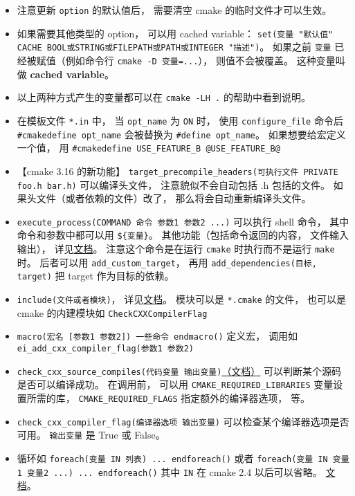 \begin{itemize}
\item 注意更新 \verb`option` 的默认值后， 需要清空 cmake 的临时文件才可以生效。
\item 如果需要其他类型的 option， 可以用 cached variable： \verb`set(变量 "默认值" CACHE BOOL或STRING或FILEPATH或PATH或INTEGER "描述")`。 如果之前 \verb`变量` 已经被赋值（例如命令行 \verb`cmake -D 变量=...`）， 则值不会被覆盖。 这种变量叫做 \textbf{cached variable}。
\item 以上两种方式产生的变量都可以在 \verb`cmake -LH .` 的帮助中看到说明。
\item 在模板文件 \verb`*.in` 中， 当 \verb`opt_name` 为 \verb`ON` 时， 使用 \verb`configure_file` 命令后 \verb`#cmakedefine opt_name` 会被替换为 \verb`#define opt_name`。 如果想要给宏定义一个值， 用 \verb`#cmakedefine USE_FEATURE_B @USE_FEATURE_B@`
\item 【cmake 3.16 的新功能】 \verb`target_precompile_headers(可执行文件 PRIVATE foo.h bar.h)` 可以编译头文件， 注意貌似不会自动包括 .h 包括的文件。 如果头文件（或者依赖的文件）改了， 那么将会自动重新编译头文件。
\item \verb`execute_process(COMMAND 命令 参数1 参数2 ...)` 可以执行 shell 命令， 其中命令和参数中都可以用 \verb`${变量}`。 其他功能（包括命令返回的内容， 文件输入输出）， 详见\href{https://cmake.org/cmake/help/latest/command/execute_process.html}{文档}。 注意这个命令是在运行 \verb`cmake` 时执行而不是运行 \verb`make` 时。 后者可以用 \verb`add_custom_target`， 再用 \verb`add_dependencies(目标, target)` 把 target 作为目标的依赖。
\item \verb`include(文件或者模块)`， 详见\href{https://cmake.org/cmake/help/latest/command/include.html}{文档}。 模块可以是 \verb`*.cmake` 的文件， 也可以是 cmake 的内建模块如 \verb`CheckCXXCompilerFlag`
\item \verb`macro(宏名 [参数1 参数2]) 一些命令 endmacro()` 定义宏， 调用如 \verb`ei_add_cxx_compiler_flag(参数1 参数2)`
\item \verb`check_cxx_source_compiles(代码变量 输出变量)`\href{https://cmake.org/cmake/help/latest/module/CheckCXXSourceCompiles.html}{（文档）} 可以判断某个源码是否可以编译成功。 在调用前， 可以用 \verb`CMAKE_REQUIRED_LIBRARIES` 变量设置所需的库， \verb`CMAKE_REQUIRED_FLAGS` 指定额外的编译器选项， 等。
\item \verb`check_cxx_compiler_flag(编译器选项 输出变量)` 可以检查某个编译器选项是否可用。 \verb`输出变量` 是 True 或 False。
\item 循环如 \verb`foreach(变量 IN 列表) ... endforeach()` 或者 \verb`foreach(变量 IN 变量1 变量2 ...) ... endforeach()` 其中 \verb`IN` 在 cmake 2.4 以后可以省略。 \href{https://cmake.org/cmake/help/latest/command/foreach.html}{文档}。

\end{itemize}
